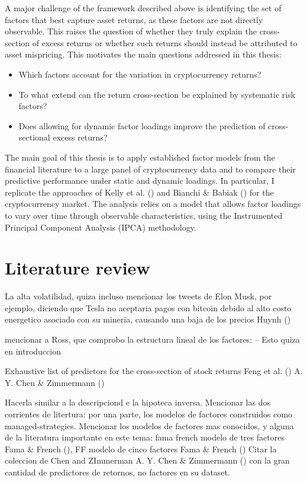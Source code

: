 \documentclass[
  12pt,
  a4paper,
  openany]{scrbook}
\providecommand{\tightlist}{%
  \setlength{\itemsep}{0pt}\setlength{\parskip}{0pt}}
\begin{document}
A major challenge of the framework described above is identifying the
set of factors that best capture asset returns, as these factors are not
directly observable. This raises the question of whether they truly
explain the cross-section of excess returns or whether such returns
should instead be attributed to asset mispricing. This motivates the
main questions addressed in this thesis:

\begin{itemize}
\tightlist
\item
  Which factors account for the variation in cryptocurrency returns?
\item
  To what extend can the return cross-section be explained by systematic
  risk factors?
\item
  Does allowing for dynamic factor loadings improve the prediction of
  cross-sectional excess returns?
\end{itemize}

The main goal of this thesis is to apply established factor models from
the financial literature to a large panel of cryptocurrency data and to
compare their predictive performance under static and dynamic loadings.
In particular, I replicate the approaches of Kelly et al.
() and Bianchi \& Babiak
() for the
cryptocurrency market. The analysis relies on a model that allows factor
loadings to vary over time through observable characteristics, using the
Instrumented Principal Component Analysis (IPCA) methodology.

\section{Literature review}\label{literature-review}

La alta volatilidad, quiza incluso mencionar los tweets de Elon Musk,
por ejemplo, diciendo que Tesla no aceptaria pagos con bitcoin debido al
alto costo energetico asociado con su mineria, causando una baja de los
precios Huynh ()

mencionar a Ross, que comprobo la estructura lineal de los factores: --
Esto quiza en introduccion

Exhaustive list of predictors for the cross-section of stock returns
Feng et al. () A. Y. Chen \&
Zimmermann ()

Hacerla similar a la descripciond e la hipoteca inversa. Mencionar las
dos corrientes de litertura: por una parte, los modelos de factores
construidos como managed-strategies. Mencionar los modelos de factores
mas conocidos, y alguna de la literatura importante en este tema: fama
french modelo de tres factores Fama \& French
(), FF modelo de cinco factores
Fama \& French () Citar la
coleccion de Chen and ZImmerman A. Y. Chen \& Zimmermann
() con la gran cantidad de
predictores de retornos, no factores en su dataset.
\end{document}
